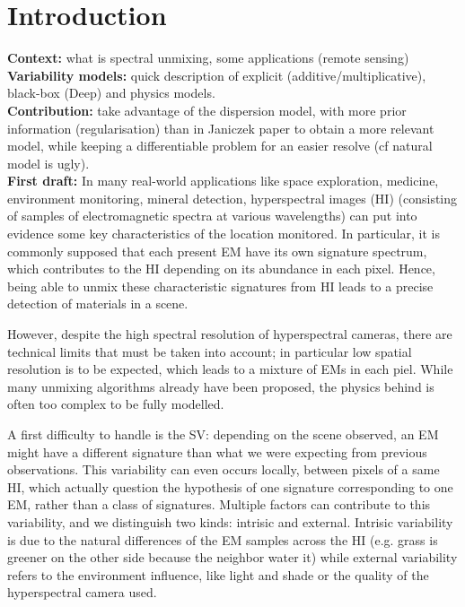 \documentclass{article}
\begin{document}
\section{Introduction}
\textbf{Context:} what is spectral unmixing, some applications (remote sensing)\\
\textbf{Variability models:} quick description of explicit (additive/multiplicative), black-box (Deep) and physics models.\\
\textbf{Contribution:} take advantage of the dispersion model, with more prior information (regularisation) than in Janiczek paper to obtain a more relevant model, while keeping a differentiable problem for an easier resolve (cf natural model is ugly).\\

\textbf{First draft:} In many real-world applications like space exploration, medicine, environment monitoring, mineral detection, hyperspectral images (HI) (consisting of samples of electromagnetic spectra at various wavelengths) can put into evidence some key characteristics of the location monitored. In particular, it is commonly supposed that each present EM have its own signature spectrum, which contributes to the HI depending on its abundance in each pixel. Hence, being able to unmix these characteristic signatures from HI leads to a precise detection of materials in a scene.

However, despite the high spectral resolution of hyperspectral cameras, there are technical limits that must be taken into account; in particular low spatial resolution is to be expected, which leads to a mixture of EMs in each piel. While many unmixing algorithms already have been proposed, the physics behind is often too complex to be fully modelled.

A first difficulty to handle is the SV: depending on the scene observed, an EM might have a different signature than what we were expecting from previous observations. This variability can even occurs locally, between pixels of a same HI, which actually question the hypothesis of one signature corresponding to one EM, rather than a class of signatures. Multiple factors can contribute to this variability, and we distinguish two kinds: intrisic and external. Intrisic variability is due to the natural differences of the EM samples across the HI (e.g. grass is greener on the other side because the neighbor water it) while external variability refers to the environment influence, like light and shade or the quality of the hyperspectral camera used.
\end{document}
